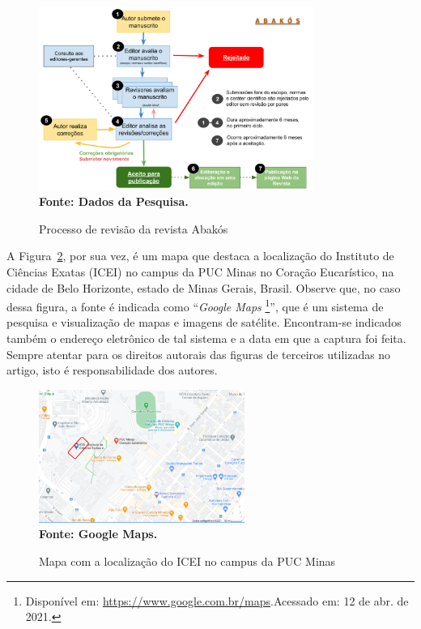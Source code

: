 \documentclass[a4paper,12pt]{article}
\begin{document}
	\begin{figure}[htb]
		\centering	
		\caption[Processo de Revisão da Revista Abakós.]{Processo de revisão da revista Abakós}
		\label{fig:figura1}
		\includegraphics[width=0.8\textwidth]{figuras/Abakos-review.png}\\
		\textbf{\footnotesize Fonte: Dados da Pesquisa.}
	\end{figure}
	
	A Figura~\ref{fig:figura2}, por sua vez, é um mapa que destaca a localização do Instituto de Ciências Exatas (ICEI) no campus da PUC Minas no Coração Eucarístico, na cidade de Belo Horizonte, estado de Minas Gerais, Brasil. Observe que, no caso dessa figura, a fonte é indicada como “{\it Google Maps}	\footnote{Disponível em: \url{https://www.google.com.br/maps}.Acessado em: 12 de abr. de 2021.}”, que é um sistema de pesquisa e visualização de mapas e imagens de satélite. Encontram-se indicados também o endereço eletrônico de tal sistema e a data em que a captura foi feita. Sempre atentar para os direitos autorais das figuras de terceiros utilizadas no artigo, isto é responsabilidade dos autores.
	
	\begin{figure}[ht]
		\centering	
		\caption[Mapa com a localização do ICEI.]{Mapa com a localização do ICEI no campus da PUC Minas}
		\label{fig:figura2}
		\includegraphics[width=0.6\textwidth]{figuras/Mapa-ICEI-PUCMinas.png}\\
		\textbf{\footnotesize Fonte: Google Maps.}
	\end{figure}
	
\end{document}
